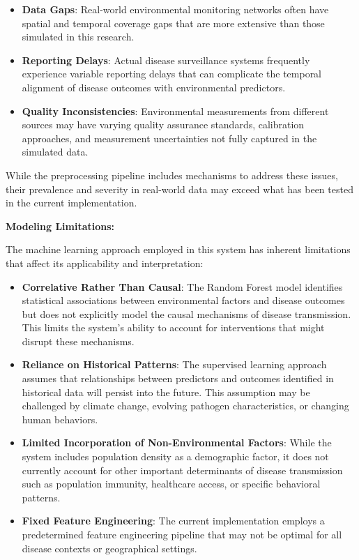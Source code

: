 \documentclass[12pt,a4paper]{report}
\begin{document}
\begin{itemize}
    \item \textbf{Data Gaps}: Real-world environmental monitoring networks often have spatial and temporal coverage gaps that are more extensive than those simulated in this research.
    
    \item \textbf{Reporting Delays}: Actual disease surveillance systems frequently experience variable reporting delays that can complicate the temporal alignment of disease outcomes with environmental predictors.
    
    \item \textbf{Quality Inconsistencies}: Environmental measurements from different sources may have varying quality assurance standards, calibration approaches, and measurement uncertainties not fully captured in the simulated data.
\end{itemize}

While the preprocessing pipeline includes mechanisms to address these issues, their prevalence and severity in real-world data may exceed what has been tested in the current implementation.

\textbf{Modeling Limitations:}

The machine learning approach employed in this system has inherent limitations that affect its applicability and interpretation:

\begin{itemize}
    \item \textbf{Correlative Rather Than Causal}: The Random Forest model identifies statistical associations between environmental factors and disease outcomes but does not explicitly model the causal mechanisms of disease transmission. This limits the system's ability to account for interventions that might disrupt these mechanisms.
    
    \item \textbf{Reliance on Historical Patterns}: The supervised learning approach assumes that relationships between predictors and outcomes identified in historical data will persist into the future. This assumption may be challenged by climate change, evolving pathogen characteristics, or changing human behaviors.
    
    \item \textbf{Limited Incorporation of Non-Environmental Factors}: While the system includes population density as a demographic factor, it does not currently account for other important determinants of disease transmission such as population immunity, healthcare access, or specific behavioral patterns.
    
    \item \textbf{Fixed Feature Engineering}: The current implementation employs a predetermined feature engineering pipeline that may not be optimal for all disease contexts or geographical settings.
\end{itemize}
\end{document}
